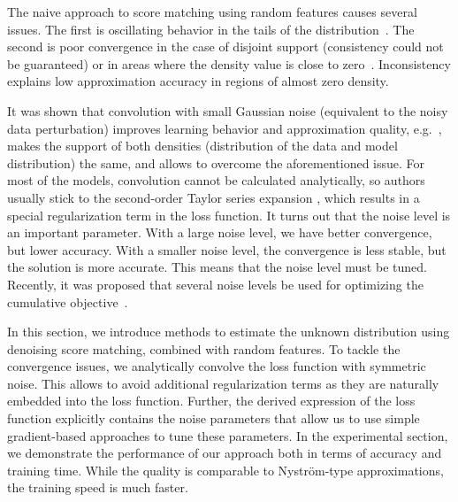 The naive approach to score matching using random features causes several issues.
The first is oscillating behavior in the tails of the distribution~\cite{Gretton2015}.
The second is poor convergence in the case of disjoint support
(consistency could not be guaranteed) or in areas
where the density value is close to zero~\cite{GrettonDeep}.
Inconsistency explains low approximation accuracy in regions of almost zero density.

It was shown that convolution with small Gaussian noise
(equivalent to the noisy data perturbation) improves learning behavior and approximation
quality, e.g.~\cite{song2019generative,GANinstability, NoisyFGAN},
makes the support of both densities (distribution of the data and model distribution)
the same, and allows to overcome the aforementioned issue.
For most of the models, convolution cannot be calculated analytically,
so authors usually stick to the second-order Taylor series expansion
\cite{NIPS2010_4060, Reehorst_2019, NoisyFGAN}, which results in a special
regularization term in the loss function.
It turns out that the noise level is an important parameter.
With a large noise level, we have better convergence, but lower accuracy.
With a smaller noise level, the convergence is less stable, but the
solution is more accurate.
This means that the noise level must be tuned.
Recently, it was proposed that several noise levels be used for optimizing the
cumulative objective~\cite{song2019generative}.


In this section, we introduce methods to estimate the unknown distribution using
denoising score matching, combined with random features.
To tackle the convergence issues, we analytically convolve the loss function with symmetric noise.
This allows to avoid additional regularization terms as they are naturally embedded into the loss function.
Further, the derived expression of the loss function explicitly contains the noise parameters
that allow us to use simple gradient-based approaches to tune these parameters.
In the experimental section, we demonstrate the performance of our approach both in terms of
accuracy and training time.
While the quality is comparable to Nystr{\"o}m-type approximations, the training speed is much faster.




